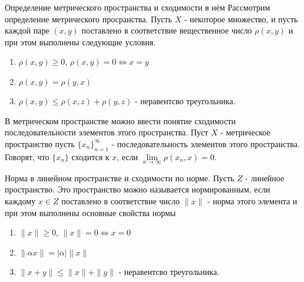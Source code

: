 \documentclass[12pt, a4paper]{article}
\newenvironment{field}{}{\newpage}
\newif\ifnote
\newenvironment{note}{\notetrue}{\notefalse}
\begin{document}
\begin{note}
\begin{field}
Определение метрического пространства и сходимости в нём
\end{field}
\begin{field}
Рассмотрим определение метрического просранства. Пусть $X$ - некоторое множество, и пусть каждой паре $(x, y)$ поставлено в соответствие вещественное число $\rho(x, y)$ и при этом выполнены следующие условия.


\begin{enumerate}
	\item{$\rho(x, y) \geq 0$, $\rho(x, y) = 0 \iff x = y$}
	\item{$\rho(x, y) = \rho(y, x)$}
	\item{$\rho(x, y) \leq \rho(x, z) + \rho(y, z)$ - неравентсво треугольника.}
\end{enumerate}
В метрическом пространстве можно ввести понятие сходимости последовательности элементов этого пространства. Пуст $X$ - метрическое пространство пусть $\{x_n\}_{n=1}^{\infty}$ - последовательность элементов этого пространства. Говорят, что $\{x_n\}$ сходится к $x$, если $\lim\limits_{n \to \infty}\rho(x_n, x) = 0$.


\end{field}
\end{note}

\begin{note}
\begin{field}
Норма в линейном пространстве и сходимости по норме.
\end{field}
\begin{field}
Пусть $Z$ - линейное пространство. Это пространство можно называется нормированным, если каждому $x \in Z$ поставлено в соответствие число $\|x\|$ - норма этого элемента и при этом выполнены основные свойства нормы

\begin{enumerate}
	\item{$\|x\| \geq 0$, $\|x\| = 0 \iff x = 0$}
	\item{$\|\alpha x\| = \mid\alpha\mid\|x\|$}
	\item{$\|x + y\| \leq \|x\| + \|y\|$ - неравентсво треугольника.}
\end{enumerate}


\end{field}
\end{note}
\end{document}
